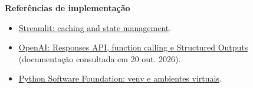 \bigskip
\noindent\textbf{Referências de implementação}

\begingroup\small
\begin{itemize}
\item \href{https://docs.streamlit.io/develop/concepts/architecture/caching}{Streamlit: caching and state management}.
\item \href{https://developers.openai.com/api/docs/guides/structured-outputs}{OpenAI: Responses API, function calling e Structured Outputs} (documentação consultada em 20 out. 2026).
\item \href{https://docs.python.org/3/library/venv.html}{Python Software Foundation: venv e ambientes virtuais}.
\end{itemize}
\endgroup
